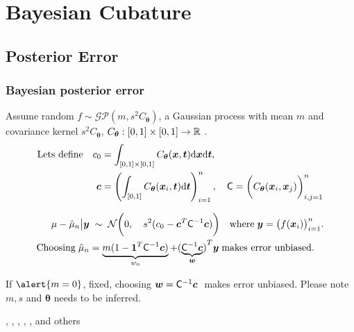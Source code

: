 \documentclass[handout, 10pt,compress,xcolor={usenames,dvipsnames}]{beamer} %
\newcommand{\bm}[1]{\boldsymbol{#1}}
\newcommand{\mCInv}{\mC^{-1}}
\newcommand{\dvx}{\dif {\vx}}
\newcommand{\dvt}{\dif {\vt}}
\renewcommand{\vtheta}{{\bm{\theta}}}
\newcommand{\pause}{}
\begin{document}
\section{Bayesian Cubature}


\subsection{Posterior Error}


\begin{frame}
\frametitle{Bayesian posterior error}
\vspace*{-4ex}
\alert{Assume random}
$f \sim \mathcal{GP} (m, s^2C_{\vtheta})$,
a \alert{Gaussian process} with mean $m$ and covariance kernel $s^2C_{\vtheta}$, $C_{\vtheta}:[0,1] \times [0,1] \to \reals$ .
\vspace*{-1ex}
\begin{align*}
\text{Lets define} \quad c_0 &= \int_{[0,1] \times [0,1]} C_{\vtheta} (\vx,\vt) \dvx \dvt, 
\\
\vc& = \left( \int_{[0,1] } C_{\vtheta} (\vx_i,\vt) \dvt \right)_{i=1}^n,
\quad
\mC =  \biggl( C_{\vtheta} (\vx_i,\vx_j) \biggr)_{i,j=1}^n
\end{align*}
\pause
\vspace*{-3ex}
\begin{align*}
\mu - \hmu_n  \big \vert \vy & \; \sim \;
\cn
\biggl( %
0, \quad s^2(c_0 - \vc ^T \mathsf{C}^{-1} \vc)
\biggr)
\quad %
\text{where} \; \vy = \bigl(f(\vx_i)\bigr)_{i=1}^n. 
\\
\text{Choosing} \; \hmu_n &= \underbrace{m(1 - \vone^T \mCInv \vc)}_{w_0} + {(\underbrace{\mC^{-1}\vc}_{\vw})}^T \vy \; \text{makes error unbiased.} 
\end{align*}
\pause
If $\alert{m = 0}$, fixed, choosing $\boldsymbol{w} = \mathsf{C}^{-1}\boldsymbol{c} \;$ makes error unbiased. Please note \alert{$m, s$ and $\vtheta$} needs to be inferred.

, , , , ,  and others
\end{frame}
\end{document}
